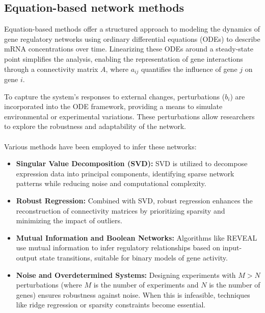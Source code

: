 \subsection{Equation-based network methods}\label{subsec:equation-based-network-methods}
Equation-based methods offer a structured approach to modeling the dynamics of gene regulatory networks using ordinary differential equations (ODEs) to describe mRNA concentrations over time.
Linearizing these ODEs around a steady-state point simplifies the analysis, enabling the representation of gene interactions through a connectivity matrix \(A\), where \(a_{ij}\) quantifies the influence of gene \(j\) on gene \(i\)\supercite{deng_molecular_2012}.


\noindent To capture the system's responses to external changes, perturbations (\(b_i\)) are incorporated into the ODE framework, providing a means to simulate environmental or experimental variations\supercite{yeung_reverse_2002}.
These perturbations allow researchers to explore the robustness and adaptability of the network.
\\\\
\noindent Various methods have been employed to infer these networks:

\begin{itemize}

    \item \textbf{Singular Value Decomposition (SVD):} SVD is utilized to decompose expression data into principal components, identifying sparse network patterns while reducing noise and computational complexity\supercite{yeung_reverse_2002}.

    \item \textbf{Robust Regression:} Combined with SVD, robust regression enhances the reconstruction of connectivity matrices by prioritizing sparsity and minimizing the impact of outliers\supercite{yeung_reverse_2002}.

    \item \textbf{Mutual Information and Boolean Networks:} Algorithms like REVEAL use mutual information to infer regulatory relationships based on input-output state transitions, suitable for binary models of gene activity\supercite{akutsu_identification_1998}.

    \item \textbf{Noise and Overdetermined Systems:} Designing experiments with \(M > N\) perturbations (where \(M\) is the number of experiments and \(N\) is the number of genes) ensures robustness against noise.
    When this is infeasible, techniques like ridge regression or sparsity constraints become essential\supercite{yeung_reverse_2002}.

\end{itemize}




